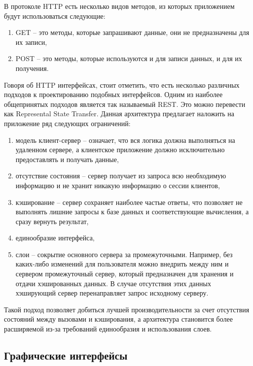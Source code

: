 В протоколе HTTP есть несколько видов методов, из которых приложением будут использоваться следующие:

\begin{enumerate}
    \item GET -- это методы, которые запрашивают данные, они не предназначены для их записи,
    \item POST -- это методы, которые используются и для записи данных, и для их получения.
\end{enumerate}

Говоря об HTTP интерфейсах, стоит отметить, что есть несколько различных подходов к проектированию
подобных интерфейсов. Одним из наиболее общепринятых подходов является так называемый REST.
Это можно перевести как Represental State Transfer\cite{REST}. Данная архитектура предлагает
наложить на приложение ряд следующих ограничений:

\begin{enumerate}
    \item модель клиент-сервер -- означает, что вся логика должна выполняться на удаленном сервере,
    а клиентское приложение должно исключительно предоставлять и получать данные,
    \item отсутствие состояния -- сервер получает из запроса всю необходимую информацию и не хранит
    никакую информацию о сессии клиентов,
    \item кэширование -- сервер сохраняет наиболее частые ответы, что позволяет не выполнять
    лишние запросы к базе данных и соответствующие вычисления, а сразу вернуть результат,
    \item единообразие интерфейса,
    \item слои -- сокрытие основного сервера за промежуточными. Например, без каких-либо
    изменений для пользователя можно внедрить между ним и сервером промежуточный сервер, который
    предназначен для хранения и отдачи хэшированных данных. В случае отсутствия этих данных
    хэширующий сервер перенаправляет запрос исходному серверу.
\end{enumerate}

Такой подход позволяет добиться лучшей производительности за счет отсутствия состояний между
вызовами и кэширования, а архитектура становится более расширяемой из-за требований
единообразия и использования слоев.

\subsection*{Графические интерфейсы}

